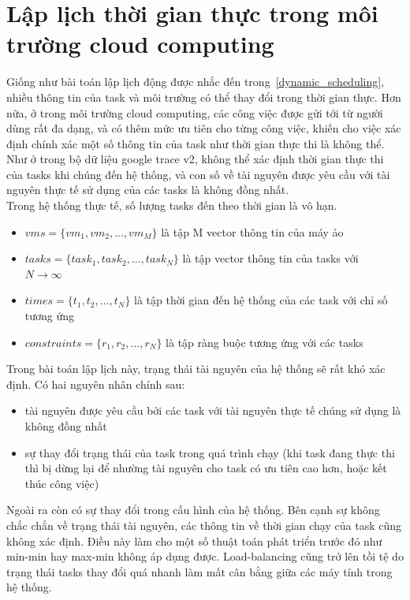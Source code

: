 \documentclass{my_style}
\begin{document}
\section{Lập lịch thời gian thực trong môi trường cloud computing}
\label{realtime}
Giống như bài toán lập lịch động được nhắc đến trong~\ref{dynamic_scheduling}, nhiều thông tin của task và môi trường có thể thay đổi trong thời gian thực. Hơn nữa, ở trong môi trường cloud computing, các công việc được gửi tới từ người dùng rất đa dạng, và có thêm mức ưu tiên cho từng công việc, khiến cho việc xác định chính xác một số thông tin của task như thời gian thực thi là không thể. Như ở trong bộ dữ liệu google trace v2\cite{18}, không thể xác định thời gian thực thi của tasks khi chúng đến hệ thống, và con số về tài nguyên được yêu cầu với tài nguyên thực tế sử dụng của các tasks là không đồng nhất\cite{17}.\\
Trong hệ thống thực tế, số lượng tasks đến theo thời gian là vô hạn. 
\begin{itemize}
	\item $vms = \{vm_{1}, vm_{2}, ..., vm_{M}\}$ là tập M vector thông tin của máy ảo
	\item $tasks = \{task_{1}, task_{2}, ..., task_{N}\}$ là tập vector thông tin của tasks với \\ $N \to \infty$
	\item $times = \{t_{1}, t_{2}, ..., t_{N}\}$ là tập thời gian đến hệ thống của các task với chỉ số tương ứng
	\item $constraints = \{r_{1}, r_{2}, ..., r_{N}\}$ là tập ràng buộc tương ứng với các tasks
\end{itemize}
Trong bài toán lập lịch này, trạng thái tài nguyên của hệ thống sẽ rất khó xác định. Có hai nguyên nhân chính sau: 
\begin{itemize}
	\item tài nguyên được yêu cầu bởi các task với tài nguyên thực tế chúng sử dụng là không đồng nhất
	\item sự thay đổi trạng thái của task trong quá trình chạy (khi task đang thực thi thì bị dừng lại để nhường tài nguyên cho task có ưu tiên cao hơn, hoặc kết thúc công việc)
\end{itemize}
Ngoài ra còn có sự thay đổi trong cấu hình của hệ thống. Bên cạnh sự không chắc chắn về trạng thái tài nguyên, các thông tin về thời gian chạy của task cũng không xác định. Điều này làm cho một số thuật toán phát triển trước đó như min-min hay max-min không áp dụng được. Load-balancing cũng trở lên tồi tệ do trạng thái tasks thay đổi quá nhanh làm mất cân bằng giữa các máy tính trong hệ thống. 
\end{document}
